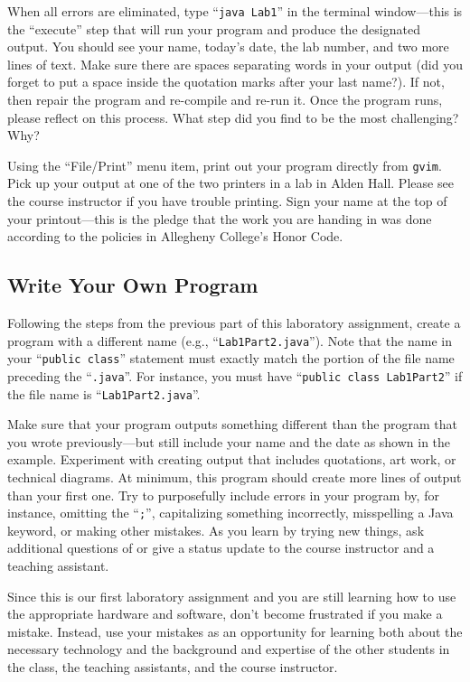 When all errors are eliminated, type ``{\tt java Lab1}'' in the terminal window---this is the ``execute'' step that will
run your program and produce the designated output.  You should see your name, today's date, the lab number, and two
more lines of text. Make sure there are spaces separating words in your output (did you forget to put a space inside the
quotation marks after your last name?). If not, then repair the program and re-compile and re-run it.  Once the program
runs, please reflect on this process.  What step did you find to be the most challenging? Why?

Using the ``File/Print'' menu item, print out your program directly from {\tt gvim}. Pick up your output at one of the
two printers in a lab in Alden Hall.  Please see the course instructor if you have trouble printing.  Sign your name at
the top of your printout---this is the pledge that the work you are handing in was done according to the policies in
Allegheny College's Honor Code.

\vspace*{-.15in}
\subsection*{Write Your Own Program}
\vspace*{-.05in}

Following the steps from the previous part of this laboratory assignment, create a program with a different name (e.g.,
``{\tt Lab1Part2.java}''). Note that the name in your ``{\tt public class}'' statement must exactly match the portion of
the file name preceding the ``{\tt .java}''.  For instance, you must have ``{\tt public class Lab1Part2}'' if the file
name is ``{\tt Lab1Part2.java}''.

Make sure that your program outputs something different than the program that you wrote previously---but still include
your name and the date as shown in the example. Experiment with creating output that includes quotations, art work, or
technical diagrams.  At minimum, this program should create more lines of output than your first one. Try to
purposefully include errors in your program by, for instance, omitting the ``{\tt ;}'', capitalizing something
incorrectly, misspelling a Java keyword, or making other mistakes. As you learn by trying new things, ask additional
questions of or give a status update to the course instructor and a teaching assistant.

Since this is our first laboratory assignment and you are still learning how to use the appropriate hardware and
software, don't become frustrated if you make a mistake. Instead, use your mistakes as an opportunity for learning both
about the necessary technology and the background and expertise of the other students in the class, the teaching
assistants, and the course instructor.

